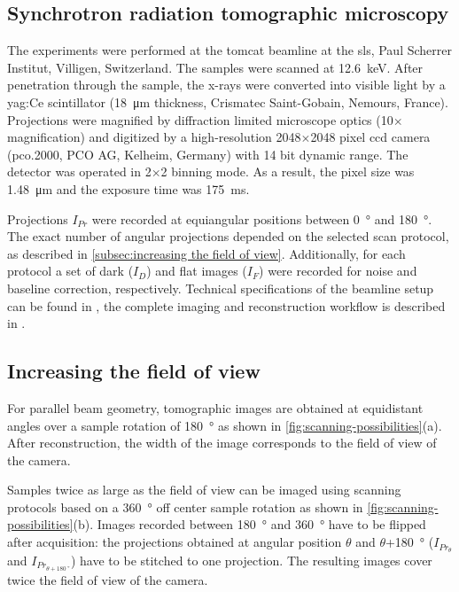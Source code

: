 \subsection{Synchrotron radiation tomographic microscopy}
The experiments were performed at the \ac{tomcat} beamline at the \acl{sls}, Paul Scherrer Institut, Villigen, Switzerland. The samples were scanned at \SI{12.6}{\kilo\electronvolt}. After penetration through the sample, the x-rays were converted into visible light by a \acs{yag}:Ce scintillator (\SI{18}{\micro\meter} thickness, Crismatec Saint-Gobain, Nemours, France). Projections were magnified by diffraction limited microscope optics (10$\times$ magnification) and digitized by a high-resolution 2048$\times$2048 pixel \ac{ccd} camera (pco.2000, PCO AG, Kelheim, Germany) with 14 bit dynamic range. The detector was operated in 2$\times$2 binning mode. As a result, the pixel size was \SI{1.48}{\micro\meter} and the exposure time was \SI{175}{\milli\second}.

Projections $I_{Pr}$ were recorded at equiangular positions between \SI{0}{\degree} and \SI{180}{\degree}. The exact number of angular projections depended on the selected scan protocol, as described in \autoref{subsec:increasing the field of view}. Additionally, for each protocol a set of dark ($I_{D}$) and flat images ($I_{F}$) were recorded for noise and baseline correction, respectively. Technical specifications of the beamline setup can be found in \cite{Stampanoni2006a}, the complete imaging and reconstruction workflow is described in \cite{Hintermueller2010}.

\subsection{Increasing the field of view}\label{subsec:increasing the field of view}
For parallel beam geometry, tomographic images are obtained at equidistant angles over a sample rotation of \SI{180}{\degree} as shown in \autoref{fig:scanning-possibilities}(a). After reconstruction, the width of the image corresponds to the field of view of the camera.

Samples twice as large as the field of view can be imaged using scanning protocols based on a \SI{360}{\degree} off center sample rotation as shown in \autoref{fig:scanning-possibilities}(b). Images recorded between \SI{180}{\degree} and \SI{360}{\degree} have to be flipped after acquisition: the projections obtained at angular position $\theta$ and $\theta$+\SI{180}{\degree} ($I_{Pr_{\theta}}$ and $I_{Pr_{\theta+\SI{180}{\degree}}}$) have to be stitched to one projection. The resulting images cover twice the field of view of the camera.

